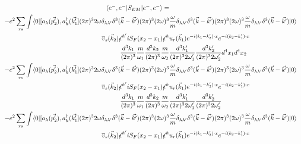 \documentclass[a4]{article}
\begin{document}
\begin{framed}
            \begin{equation}
                \begin{aligned}
                    \langle e^{-}, e^{-} | S_{EM} | e^{-}, e^{-} \rangle = \\
                    - e^{2} \sum_{r s} \int \langle 0 |[a_{\lambda} (\vec{p'_2}),a^{\dagger}_{h} (\vec{k'_1}] (2 \pi)^{3} 2 \omega \delta_{\lambda \lambda'} \delta^{3} (\vec{k} - \vec{k'}) (2 \pi)^{3} (2 \omega)^{3} & \frac{\omega}{m} \delta_{\lambda \lambda'} \delta^{3} (\vec{k} - \vec{k'}) (2 \pi)^{3} (2 \omega)^{3} \frac{\omega}{m} \delta_{\lambda \lambda'} \delta^{3} (\vec{k} - \vec{k'})| 0 \rangle \\
                    \overline{v}_{s} (\vec{k}_2) \slashed{\epsilon}^{h'} i S_{F} (x_2 - x_1) \slashed{\epsilon}^{h} & u_{r} (\vec{k}_1) e^{- i (k_1 - k'_2) \cdot x} e^{- i (k_2 - k'_1) \cdot x} \\
                    \frac{d^3 k_1}{(2 \pi)^{3}} \frac{m}{\omega_1} \frac{d^3 k_2}{(2 \pi)^{3}} \frac{m}{\omega_2} & \frac{d^3 k'_1}{(2 \pi)^{3} 2 \omega'_1} \frac{d^3 k'_2}{(2 \pi)^{3} 2 \omega'_2} d^4 x_1 d^4 x_2 \\
                    - e^{2} \sum_{r s} \int \langle 0 |[a_{\lambda} (\vec{p'_2}),a^{\dagger}_{h} (\vec{k'_1}] (2 \pi)^{3} 2 \omega \delta_{\lambda \lambda'} \delta^{3} (\vec{k} - \vec{k'}) (2 \pi)^{3} (2 \omega)^{3} & \frac{\omega}{m} \delta_{\lambda \lambda'} \delta^{3} (\vec{k} - \vec{k'}) (2 \pi)^{3} (2 \omega)^{3} \frac{\omega}{m} \delta_{\lambda \lambda'} \delta^{3} (\vec{k} - \vec{k'})| 0 \rangle \\
                    \overline{v}_{s} (\vec{k}_2) \slashed{\epsilon}^{h'} i S_{F} (x_2 - x_1) \slashed{\epsilon}^{h} & u_{r} (\vec{k}_1) e^{- i (k_1 - k'_2) \cdot x} e^{- i (k_2 - k'_1) \cdot x} \\
                    \frac{d^3 k_1}{(2 \pi)^{3}} \frac{m}{\omega_1} \frac{d^3 k_2}{(2 \pi)^{3}} \frac{m}{\omega_2} & \frac{d^3 k'_1}{(2 \pi)^{3} 2 \omega'_1} \frac{d^3 k'_2}{(2 \pi)^{3} 2 \omega'_2} \\
                    - e^{2} \sum_{r s} \int \langle 0 |[a_{\lambda} (\vec{p'_2}),a^{\dagger}_{h} (\vec{k'_1}] (2 \pi)^{3} 2 \omega \delta_{\lambda \lambda'} \delta^{3} (\vec{k} - \vec{k'}) (2 \pi)^{3} (2 \omega)^{3} & \frac{\omega}{m} \delta_{\lambda \lambda'} \delta^{3} (\vec{k} - \vec{k'}) (2 \pi)^{3} (2 \omega)^{3} \frac{\omega}{m} \delta_{\lambda \lambda'} \delta^{3} (\vec{k} - \vec{k'})| 0 \rangle \\
                    \overline{v}_{s} (\vec{k}_2) \slashed{\epsilon}^{h'} i S_{F} (x_2 - x_1) \slashed{\epsilon}^{h} & u_{r} (\vec{k}_1) e^{- i (k_1 - k'_2) \cdot x} e^{- i (k_2 - k'_1) \cdot x} \\

\end{aligned}
\end{equation}
\end{framed}
\end{document}
